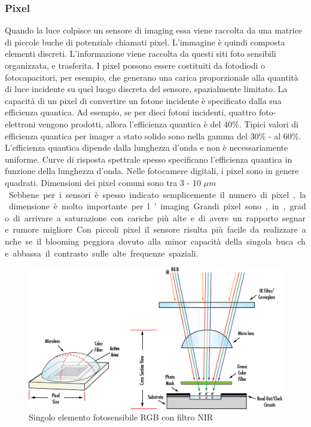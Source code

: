 \subsubsection{Pixel}
Quando la luce colpisce un sensore di imaging essa viene raccolta da una matrice di piccole buche di potenziale chiamati pixel.
 L'immagine è quindi composta elementi discreti. L'informazione viene raccolta da questi siti foto sensibili organizzata, e trasferita.
I pixel possono essere costituiti da fotodiodi o fotocapacitori, per esempio, che generano una carica proporzionale alla quantità di luce incidente su quel luogo discreta del sensore, spazialmente limitato. La capacità di un pixel di convertire un fotone incidente è specificato dalla sua efficienza quantica. Ad esempio, se per dieci fotoni incidenti, quattro foto-elettroni vengono prodotti, allora l'efficienza quantica è del 40\%. Tipici valori di efficienza quantica per imager a stato solido sono nella gamma del 30\% - al 60\%. L'efficienza quantica dipende dalla lunghezza d'onda e non è necessariamente uniforme. Curve di risposta spettrale spesso specificano l'efficienza quantica in funzione della lunghezza d'onda.
Nelle fotocamere digitali, i pixel sono in genere quadrati. Dimensioni dei pixel comuni sono tra 3 - 10 \unit{$\mu m$}. Sebbene per i sensori è spesso indicato semplicemente il numero di pixel, la dimensione è molto importante per l'imaging. Grandi pixel sono, in, grado di arrivare a saturazione con cariche più alte e di avere un rapporto segnare rumore migliore. Con piccoli pixel il sensore risulta più facile da realizzare anche se il blooming peggiora dovuto alla minor capacità della singola buca che abbassa il contrasto sulle alte frequenze spaziali.
\begin{figure}[!ht]
\centering
\includegraphics[width=.8\textwidth]{img/pixel.png}
\caption{Singolo elemento fotosensibile RGB con filtro NIR}
\label{fig:pixel}
\end{figure}

